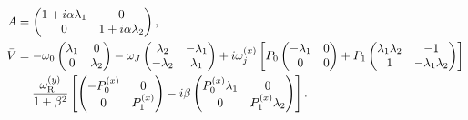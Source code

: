 \begin{subequations}
\begin{align}
    \bar{A} &=
    \begin{pmatrix}
     1+i\alpha\lambda_1 & 0 \\
     0 & 1+i\alpha\lambda_2
    \end{pmatrix}, \\
    \nonumber\bar{V} &=
    -\omega_0\begin{pmatrix}
     \lambda_1 & 0 \\
     0 & \lambda_2
    \end{pmatrix}
    - \omega_J \begin{pmatrix}
     \lambda_2 & -\lambda_1 \\
     -\lambda_2 & \lambda_1
    \end{pmatrix}
    + i\omega_j^{(x)}\left[P_0
    \begin{pmatrix}
     -\lambda_1 & 0 \\
     0 & 0
    \end{pmatrix}
    + P_1
    \begin{pmatrix}
     \lambda_1\lambda_2 & -1 \\
     1 & -\lambda_1\lambda_2
    \end{pmatrix}\right] \\
    &\hspace{4.5mm} \frac{\omega_{\text{R}}^{(y)}}{1+\beta^2}\left[
    \begin{pmatrix}
     -P_0^{(x)} & 0 \\
     0 & P_1^{(x)}
    \end{pmatrix}
    - i \beta
    \begin{pmatrix}
     P_0^{(x)}\lambda_1 & 0 \\
     0 & P_1^{(x)}\lambda_2
    \end{pmatrix}\right].
\end{align}
\end{subequations}